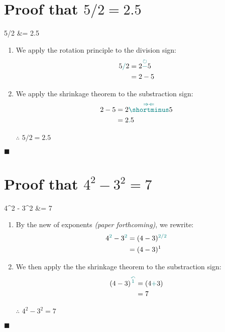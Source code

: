 \documentclass[12pt, titlepage,french]{article}
\begin{document}
\clearpage

\section{Proof that $5/2	=	2.5$}

\begin{theorems}[Theorem]
	5/2
	&=	2.5
\end{theorems}

\begin{distributions}[Proof]
\begin{enumerate}
	\item	We apply the rotation principle to the division sign:
		\begin{align*}
		5{\color{teal}/}2
		&=	2{\color{teal} \overset{\circlearrowright}{-}}5	\\
		&=	2	-	5
		\end{align*}
	\item	We apply the shrinkage theorem to the substraction sign:
		\begin{align*}
		2	-	5
		&=	2	{\color{teal}\overset{\Rightarrow\Leftarrow}{\shortminus}}	5	\\
		&=	2{\color{teal}.}5
		\end{align*}
	\item[$\therefore$]	$5/2	=	2.5$
\end{enumerate}
\end{distributions}
$\blacksquare$

\clearpage

\section{Proof that $4^{2}	-	3^{2}	=	7$}

\begin{theorems}[Theorem]
	4^{2}	-	3^{2}	
	&=	7
\end{theorems}

\begin{distributions}[Proof]
\begin{enumerate}
	\item	By the new  of exponents \textit{(paper forthcoming)}, we rewrite:
		\begin{align*}
		4^{\color{teal}2}	-	3^{\color{teal}2}	
		&=	(4	-	3)^{\color{teal}2/2}		\\
		&=	(4	-	3)^{1}		
		\end{align*}
	\item	We then apply the  the shrinkage theorem to the substraction sign:
		\begin{align*}
		(4	-	3)^{\color{teal}\overset{\curvearrowleft}{1}}
		&=	(4	{\color{teal}+}	3)	\\
		&=	7
		\end{align*}
	\item[$\therefore$]	$4^{2}	-	3^{2}	=	7$
\end{enumerate}
\end{distributions}
$\blacksquare$
\end{document}
